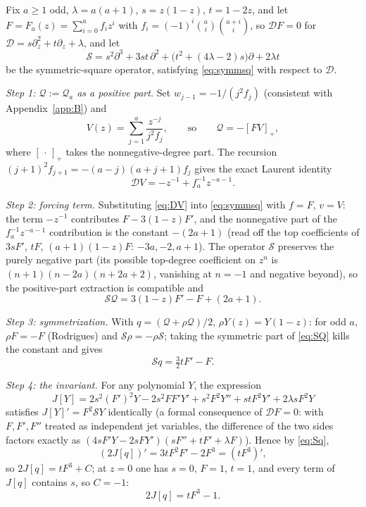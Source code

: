 \documentclass[11pt]{amsart}
\theoremstyle{definition}
\theoremstyle{remark}
\begin{document}
Fix $a\ge1$ odd, $\lambda=a(a+1)$, $s=z(1-z)$, $t=1-2z$, and let
$F=F_a(z)=\sum_{i=0}^a f_iz^i$ with
$f_i=(-1)^i\binom ai\binom{a+i}{i}$, so $\mathcal DF=0$ for
$\mathcal D=s\partial_z^2+t\partial_z+\lambda$, and let
\[
\mathcal S=s^2\partial^3+3st\,\partial^2
+\bigl(t^2+(4\lambda-2)s\bigr)\partial+2\lambda t
\]
be the symmetric-square operator, satisfying \eqref{eq:symmsq} with
respect to $\mathcal D$.

\emph{Step 1: $\mathcal Q:=\mathcal Q_a$ as a positive part.}
Set $w_{j-1}=-1/(j^2f_j)$ (consistent with Appendix~\ref{app:B}) and
\[
V(z)=\sum_{j=1}^{a}\frac{z^{-j}}{j^2f_j},
\qquad\text{so}\qquad
\mathcal Q=-[FV]_+,
\]
where $[\,\cdot\,]_+$ takes the nonnegative-degree part. The recursion
$(j+1)^2f_{j+1}=-(a-j)(a+j+1)f_j$ gives the exact Laurent identity
\begin{equation}\label{eq:DV}
\mathcal DV=-z^{-1}+f_a^{-1}z^{-a-1}.
\end{equation}

\emph{Step 2: forcing term.} Substituting \eqref{eq:DV} into
\eqref{eq:symmsq} with $f=F$, $v=V$: the term $-z^{-1}$ contributes
$F-3(1-z)F'$, and the nonnegative part of the $f_a^{-1}z^{-a-1}$
contribution is the constant $-(2a+1)$ (read off the top coefficients
of $3sF'$, $tF$, $(a+1)(1-z)F$: $-3a,-2,a+1$). The operator $\mathcal S$
preserves the purely negative part (its possible top-degree coefficient
on $z^n$ is $(n+1)(n-2a)(n+2a+2)$, vanishing at $n=-1$ and negative
beyond), so the positive-part extraction is compatible and
\begin{equation}\label{eq:SQ}
\mathcal S\mathcal Q=3(1-z)F'-F+(2a+1).
\end{equation}

\emph{Step 3: symmetrization.} With $q=(\mathcal Q+\rho\mathcal Q)/2$,
$\rho Y(z)=Y(1-z)$: for odd $a$, $\rho F=-F$ (Rodrigues) and
$\mathcal S\rho=-\rho\mathcal S$; taking the symmetric part of
\eqref{eq:SQ} kills the constant and gives
\begin{equation}\label{eq:Sq}
\mathcal Sq=\tfrac32tF'-F .
\end{equation}

\emph{Step 4: the invariant.} For any polynomial $Y$, the expression
\[
J[Y]=2s^2(F')^2Y-2s^2FF'Y'+s^2F^2Y''+stF^2Y'+2\lambda sF^2Y
\]
satisfies $J[Y]'=F^2\mathcal SY$ identically (a formal consequence of
$\mathcal DF=0$: with $F,F',F''$ treated as independent jet variables,
the difference of the two sides factors exactly as
$(4sF'Y-2sFY')(sF''+tF'+\lambda F)$). Hence by \eqref{eq:Sq},
\[
(2J[q])'=3tF^2F'-2F^3=(tF^3)',
\]
so $2J[q]=tF^3+C$; at $z=0$ one has $s=0$, $F=1$, $t=1$, and every term
of $J[q]$ contains $s$, so $C=-1$:
\begin{equation}\label{eq:Jq}
2J[q]=tF^3-1 .
\end{equation}
\end{document}
